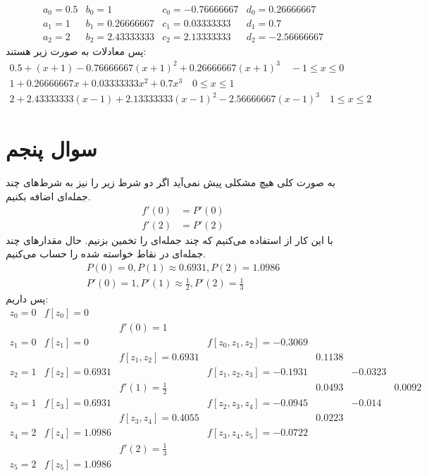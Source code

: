 \documentclass[]{article}
\begin{document}
\[
\begin{array}{cccc}
    a_0 = 0.5 & b_0 = 1 & c_0 = -0.76666667 & d_0 = 0.26666667\\
    a_1 = 1 & b_1 = 0.26666667 & c_1 = 0.03333333 & d_1 = 0.7\\
    a_2 = 2 & b_2 = 2.43333333 & c_2 = 2.13333333 & d_2 = -2.56666667
\end{array}
\]
پس معادلات به صورت زیر هستند:
\begin{gather*}
    0.5 + (x + 1) -0.76666667 (x + 1)^2 + 0.26666667 (x + 1)^3 \quad -1 \le x \le 0\\
    1 + 0.26666667 x + 0.03333333x^2 + 0.7 x^3 \quad 0 \le x \le 1\\
    2 + 2.43333333 (x - 1) + 2.13333333 (x-1)^2 -2.56666667 (x - 1)^3 \quad 1 \le x \le 2
\end{gather*}
\section*{سوال پنجم}
به صورت کلی هیچ مشکلی پیش نمی‌آید اگر دو شرط زیر را نیز به شرط‌های چند جمله‌ای اضافه بکنیم.
\begin{align*}
    f'(0) &= P'(0)\\
    f'(2) &= P'(2)
\end{align*}
با این کار از
استفاده می‌کنیم که چند جمله‌ای را تخمین بزنیم.
حال مقدار‌های چند جمله‌ای در نقاط خواسته شده را حساب می‌کنیم.
\begin{gather*}
    P(0) = 0, P(1) \approx 0.6931, P(2) = 1.0986\\
    P'(0) = 1, P'(1) \approx \frac{1}{2}, P'(2) = \frac{1}{3}
\end{gather*}
پس داریم:
\[
\begin{array}{ccccccc}
z_0 = 0 & f[z_0] = 0 \\
&& f'(0) = 1 \\
z_1 = 0 & f[z_1] = 0 && f[z_0,z_1,z_2] = -0.3069\\
&& f[z_1,z_2] = 0.6931 && 0.1138\\
z_2 = 1 & f[z_2] = 0.6931 && f[z_1,z_2,z_3] = -0.1931 && -0.0323\\
&& f'(1) = \frac{1}{2} && 0.0493 && 0.0092\\
z_3 = 1 & f[z_3] = 0.6931 && f[z_2,z_3,z_4] = -0.0945 && -0.014 \\
&& f[z_3,z_4] = 0.4055 && 0.0223 \\
z_4 = 2 & f[z_4] = 1.0986&&f[z_3,z_4,z_5] = -0.0722\\
&&f'(2) = \frac{1}{3}\\
z_5 = 2 & f[z_5] = 1.0986\\
\end{array}
\]
\end{document}
